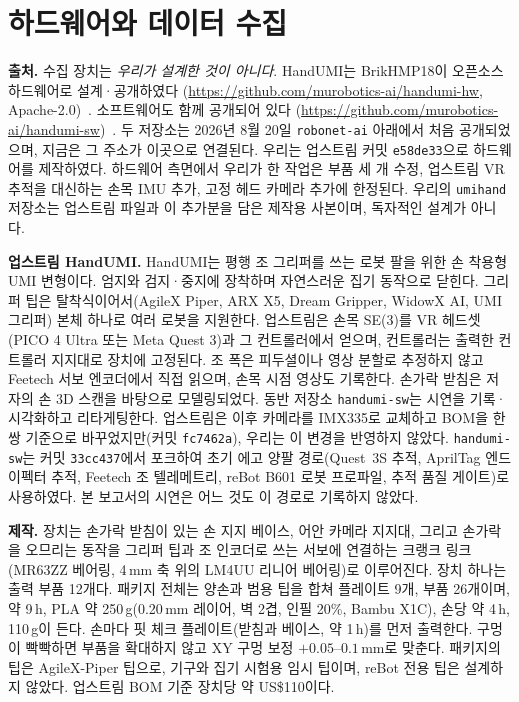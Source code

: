 \documentclass[conference,10pt]{IEEEtran}
\newcommand{\mm}{\,mm\xspace}
\begin{document}
\section{하드웨어와 데이터 수집}\label{sec:hw}
\textbf{출처.} 수집 장치는 \emph{우리가 설계한 것이 아니다}. HandUMI는 BrikHMP18이 오픈소스 하드웨어로 설계·공개하였다
(\url{https://github.com/murobotics-ai/handumi-hw}, Apache-2.0)~\cite{handumi_hw}. 소프트웨어도 함께 공개되어 있다
(\url{https://github.com/murobotics-ai/handumi-sw})~\cite{handumi_sw}. 두 저장소는 2026년 8월 20일 \texttt{robonet-ai} 아래에서 처음
공개되었으며, 지금은 그 주소가 이곳으로 연결된다. 우리는 업스트림 커밋 \texttt{e58de33}으로 하드웨어를 제작하였다. 하드웨어 측면에서
우리가 한 작업은 부품 세 개 수정, 업스트림 VR 추적을 대신하는 손목 IMU 추가, 고정 헤드 카메라 추가에 한정된다. 우리의
\texttt{umihand} 저장소는 업스트림 파일과 이 추가분을 담은 제작용 사본이며, 독자적인 설계가 아니다.

\textbf{업스트림 HandUMI.} HandUMI는 평행 조 그리퍼를 쓰는 로봇 팔을 위한 손 착용형 UMI 변형이다. 엄지와 검지·중지에 장착하며
자연스러운 집기 동작으로 닫힌다. 그리퍼 팁은 탈착식이어서(AgileX Piper, ARX X5, Dream Gripper, WidowX AI, UMI 그리퍼) 본체 하나로
여러 로봇을 지원한다. 업스트림은 손목 SE(3)를 VR 헤드셋(PICO 4 Ultra 또는 Meta Quest 3)과 그 컨트롤러에서 얻으며, 컨트롤러는 출력한
컨트롤러 지지대로 장치에 고정된다. 조 폭은 피두셜이나 영상 분할로 추정하지 않고 Feetech 서보 엔코더에서 직접 읽으며, 손목 시점
영상도 기록한다. 손가락 받침은 저자의 손 3D 스캔을 바탕으로 모델링되었다. 동반 저장소 \texttt{handumi-sw}는 시연을 기록·시각화하고
리타게팅한다. 업스트림은 이후 카메라를 IMX335로 교체하고 BOM을 한 쌍 기준으로 바꾸었지만(커밋 \texttt{fc7462a}), 우리는 이 변경을
반영하지 않았다. \texttt{handumi-sw}는 커밋 \texttt{33cc437}에서 포크하여 초기 에고 양팔 경로(Quest~3S 추적, AprilTag 엔드이펙터 추적,
Feetech 조 텔레메트리, reBot B601 로봇 프로파일, 추적 품질 게이트)로 사용하였다. 본 보고서의 시연은 어느 것도 이 경로로 기록하지
않았다.

\textbf{제작.} 장치는 손가락 받침이 있는 손 지지 베이스, 어안 카메라 지지대, 그리고 손가락을 오므리는 동작을 그리퍼 팁과 조 인코더로
쓰는 서보에 연결하는 크랭크 링크(MR63ZZ 베어링, 4\mm{} 축 위의 LM4UU 리니어 베어링)로 이루어진다. 장치 하나는 출력 부품 12개다.
패키지 전체는 양손과 범용 팁을 합쳐 플레이트 9개, 부품 26개이며, 약 9\,h, PLA 약 250\,g(0.20\mm{} 레이어, 벽 2겹, 인필 20\%, Bambu
X1C), 손당 약 4\,h, 110\,g이 든다. 손마다 핏 체크 플레이트(받침과 베이스, 약 1\,h)를 먼저 출력한다. 구멍이 빡빡하면 부품을 확대하지
않고 XY 구멍 보정 $+0.05$--$0.1$\mm{}로 맞춘다. 패키지의 팁은 AgileX-Piper 팁으로, 기구와 집기 시험용 임시 팁이며, reBot 전용 팁은
설계하지 않았다. 업스트림 BOM 기준 장치당 약 US\$110이다.
\end{document}

